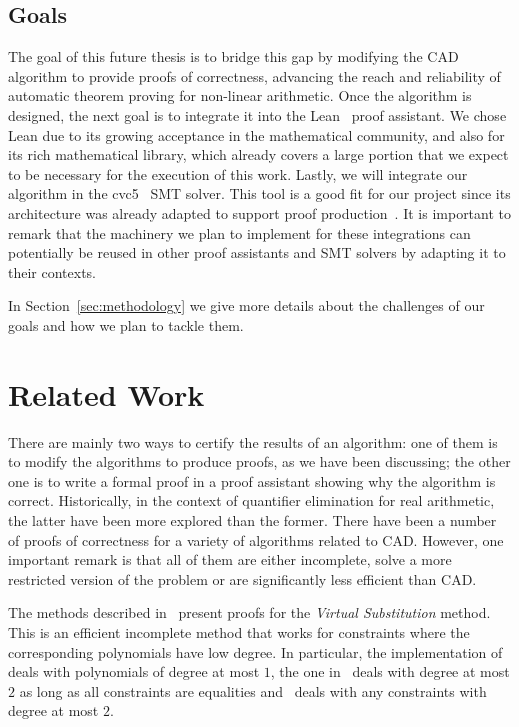\documentclass[a4paper, 12pt]{article}
\begin{document}
\subsection{Goals}

The goal of this future thesis is to bridge this gap by modifying the CAD algorithm to provide
proofs of correctness, advancing the reach and reliability of automatic theorem proving
for non-linear arithmetic. Once the algorithm is designed, the next goal is to integrate it
into the Lean~\cite{lean4} proof assistant. We chose Lean due to its growing acceptance in the mathematical
community, and also for its rich mathematical library, which already covers a large portion that
we expect to be necessary for the execution of this work. Lastly, we will integrate our algorithm
in the cvc5~\cite{cvc5} SMT solver. This tool is a good fit for our project since its architecture
was already adapted to support proof production~\cite{flexibleProofs}. It is important to remark
that the machinery we plan to implement for these integrations can potentially be reused in other proof
assistants and SMT solvers by adapting it to their contexts.

In Section~\ref{sec:methodology} we give more details about the challenges of our goals and how we
plan to tackle them.


\section{Related Work}
\label{sec:relatedWork}

There are mainly two ways to certify the results of an algorithm: one of them is to modify the
algorithms to produce proofs, as we have been discussing; the other one is to write a formal proof in a proof assistant
showing why the algorithm is correct. Historically, in the context of quantifier elimination for real arithmetic, the latter have
been more explored than the former. There have been a number of proofs of correctness for a variety of algorithms related to CAD.
However, one important remark is that all of them are either incomplete, solve a more restricted version of the problem
or are significantly less efficient than CAD.

The methods described in~\cite{kosaian2,nipkowVS,chaiebVS} present proofs for the \textit{Virtual Substitution} method.
This is an efficient incomplete method that works for constraints where the corresponding polynomials have low degree.
In particular, the implementation of~\cite{nipkowVS} deals with polynomials of degree at most $1$, the one
in~\cite{chaiebVS} deals with degree at most $2$ as long as all constraints are equalities and~\cite{kosaian2}
deals with any constraints with degree at most $2$.
\end{document}
